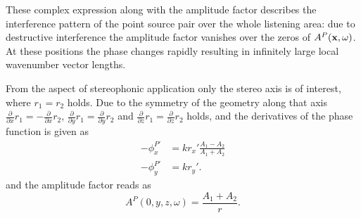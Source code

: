 These complex expression along with the amplitude factor describes the interference pattern of the point source pair over the whole listening area: 
due to destructive interference the amplitude factor vanishes over the zeros of $A^P(\mathbf{x},\omega)$.
At these positions the phase changes rapidly resulting in infinitely large local wavenumber vector lengths.

From the aspect of stereophonic application only the stereo axis is of interest, where $r_1 = r_2$ holds.
Due to the symmetry of the geometry along that axis $\frac{\partial}{\partial x} r_1 = - \frac{\partial}{\partial x} r_2$, $\frac{\partial}{\partial y} r_1 = \frac{\partial}{\partial y} r_2$ and $\frac{\partial}{\partial z} r_1 = \frac{\partial}{\partial z} r_2$ holds, and the derivatives of the phase function is given as
\begin{align}
-\phi^{P'}_x &= k r_x' \frac{ A_1  - A_2 
 }{ A_1 + A_2} \\
-\phi^{P'}_y &= k r_y'.
\end{align}
and the amplitude factor reads as
\begin{equation}
A^P(0,y,z,\omega) = \frac{A_1 +  A_2}{r}.
\label{Eq:AppB:stereo_amplitude}
\end{equation}